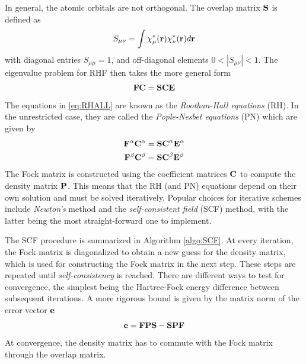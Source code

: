 In general, the atomic orbitals are not orthogonal. The overlap matrix $\mathbf{S}$ is defined as 
\begin{equation}
S_{\mu\nu} = \int \chi_{\mu}^*(\mathbf{r}) \chi_{\nu}^*(\mathbf{r}) d\mathbf{r}
\end{equation}
\noindent with diagonal entries $S_{\mu\mu} = 1$, and off-diagonal elements $0 < \left\lvert S_{\mu\nu} \right\rvert < 1$. The eigenvalue problem for RHF then takes the more general form
\begin{equation}
\mathbf{F} \mathbf{C} = \mathbf{SC} \mathbf{E}
\label{eq:RHALL}
\end{equation}
\noindent The equations in \ref{eq:RHALL} are known as the \emph{Roothan-Hall equations} (RH). In the unrestricted case, they are called the \emph{Pople-Nesbet equations} (PN) which are given by
\begin{align}
\mathbf{F}^{\alpha} \mathbf{C}^{\alpha} &= \mathbf{SC}^{\alpha} \mathbf{E}^{\alpha} \\
\mathbf{F}^{\beta} \mathbf{C}^{\beta} &= \mathbf{SC}^{\beta} \mathbf{E}^{\beta}
\end{align}  
\noindent The Fock matrix is constructed using the coefficient matrices $\mathbf{C}$ to compute the density matrix $\mathbf{P}$. This means that the RH (and PN) equations depend on their own solution and must be solved iteratively. Popular choices for iterative schemes include \emph{Newton's} method and the \emph{self-consistent field} (SCF) method, with the latter being the most straight-forward one to implement. 

The SCF procedure is summarized in Algorithm \ref{algo:SCF}. At every iteration, the Fock matrix is diagonalized to obtain a new guess for the density matrix, which is used for constructing the Fock matrix in the next step. These steps are repeated until \emph{self-consistency} is reached. There are different ways to test for convergence, the simplest being the Hartree-Fock energy difference between subsequent iterations. A more rigorous bound is given by the matrix norm of the error vector $\mathbf{e}$
\begin{equation}
\mathbf{e} = \mathbf{FPS} - \mathbf{SPF} 
\end{equation}
\noindent At convergence, the density matrix has to commute with the Fock matrix through the overlap matrix. 

